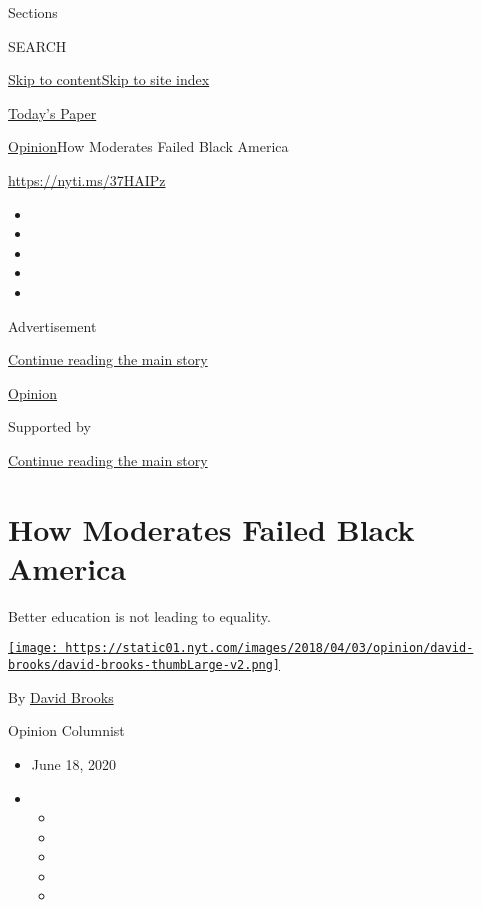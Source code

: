 Sections

SEARCH

\protect\hyperlink{site-content}{Skip to
content}\protect\hyperlink{site-index}{Skip to site index}

\href{https://myaccount.nytimes.com/auth/login?response_type=cookie\&client_id=vi}{}

\href{https://www.nytimes.com/section/todayspaper}{Today's Paper}

\href{/section/opinion}{Opinion}\textbar{}How Moderates Failed Black
America

\href{https://nyti.ms/37HAIPz}{https://nyti.ms/37HAIPz}

\begin{itemize}
\item
\item
\item
\item
\item
\end{itemize}

Advertisement

\protect\hyperlink{after-top}{Continue reading the main story}

\href{/section/opinion}{Opinion}

Supported by

\protect\hyperlink{after-sponsor}{Continue reading the main story}

\hypertarget{how-moderates-failed-black-america}{%
\section{How Moderates Failed Black
America}\label{how-moderates-failed-black-america}}

Better education is not leading to equality.

\href{https://www.nytimes.com/by/david-brooks}{\texttt{[image: https://static01.nyt.com/images/2018/04/03/opinion/david-brooks/david-brooks-thumbLarge-v2.png]}}

By \href{https://www.nytimes.com/by/david-brooks}{David Brooks}

Opinion Columnist

\begin{itemize}
\item
  June 18, 2020
\item
  \begin{itemize}
  \item
  \item
  \item
  \item
  \item
  \end{itemize}
\end{itemize}

